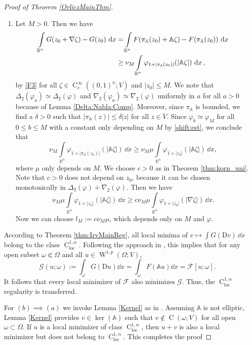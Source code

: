 \documentclass[a4paper,11pt]{amsart}
\numberwithin{equation}{section}
\newcommand{\R}{\mathbb{R}}
\newcommand{\sobo}{\operatorname{W}}
\newcommand{\hold}{\operatorname{C}}
\begin{document}
\begin{proof}[Proof of Theorem \ref{OrliczMainThm}]
\begin{enumerate}
			\item Let $M > 0$. Then we have
			\begin{align}
				\int \limits_{\R^n} G(z_0 + \nabla \zeta) - G(z_0) \, \dd{x} & = \int \limits_{\R^n} F(\pi_{\mathbb{A}} (z_0) + \mathbb{A} \zeta) - F(\pi_{\mathbb{A}} (z_0)) \, \dd{x} \label{eq:juhu}\\
				& \geq  \nu_M \int \limits_{\R^n} \varphi_{1+|\pi_{\mathbb{A}}(z_0)|}(|\mathbb{A} \zeta|) \, \dd{x},\notag
			\end{align}
			by \ref{F3} for all $\zeta \in \hold_c^\infty((0,1)^n; V)$ and $|z_0| \leq M$.
			We note that $\Delta_2(\varphi_a) \simeq \Delta_2(\varphi)$ and $\nabla_2(\varphi_a) \simeq\nabla_2(\varphi)$ uniformly in $a$ for all $a>0$ because of Lemma \ref{Delta:Nabla:Comp}. Moreover, since $\pi_{\mathbb{A}}$ is bounded, we find a $\delta > 0$ such that $|\pi_{\mathbb{A}}(z)| \leq \delta |z|$ for all $z \in V$. Since $\varphi_b \simeq \varphi_{M}$ for all $0 \leq b \leq M$ with a constant only depending on $M$ by \eqref{shift:est}, we conclude that
			\[
			\nu_M \int \limits_{\R^n} \varphi_{1+|\pi_{\mathbb{A}}(z_0)|}(|\mathbb{A} \zeta|) \, \dd{x} \geq \nu_M \mu \int \limits_{\R^n} \varphi_{1+|z_0|}(|\mathbb{A} \zeta|) \, \dd{x},
			\]
			where $\mu$ only depends on $M$. We choose $c > 0$ as in Theorem \ref{thm:korn_uni}. Note that $c > 0$ does not depend on $z_0$, because it can be chosen monotonically in $\Delta_2(\varphi) + \nabla_2(\varphi)$. Then we have
			\[
			\nu_M \mu \int \limits_{\R^n} \varphi_{1+|z_0|}(|\mathbb{A} \zeta|) \, \dd{x} \geq c \nu_M \mu \int \limits_{\R^n} \varphi_{1+|z_0|}(|\nabla \zeta|) \, \dd{x}.
			\]
			Now we can choose $l_M := c \nu_M \mu$, which depends only on $M$ and $\varphi$.
		\end{enumerate}
		According to Theorem \ref{thm:IrvMainReg}, all local minima of $v \mapsto \int G(\mathrm{D} v) \, \dd{x}$ belong to the class $\hold_\text{loc}^{1, \alpha}$. Following the approach in \cite{contiFXG}, this implies that for any open subset $\omega \Subset \Omega$ and all $u \in \sobo^{1,p}(\Omega;V)$,
		\begin{equation}
			\mathcal{G}(u; \omega) := \int_\omega G(\mathrm{D}u) \dd{x} = \int_\omega F(\mathbb{A}u) \dd{x} = \mathcal{F}[u;\omega]. \label{fct:G}
		\end{equation}
		It follows that every local minimizer of $\mathcal{F}$ also minimizes $\mathcal{G}$. Thus, the $\hold_{\text{loc}}^{1, \alpha}$ regularity is transferred.
		
		For  $(b)\!\implies\!(a)$ we invoke Lemma \ref{Kernel} as in \cite{contiFXG}. Assuming $\mathbb{A}$ is not elliptic, Lemma \ref{Kernel} provides $v \in \ker(\mathbb{A})$ such that $v \not \in \hold(\omega; V)$ for all open $\omega \subset \Omega$. If $u$ is a local minimizer of class $\hold^{1,\alpha}_{\text{loc}}$, then $u+v$ is also a local minimizer but does not belong to $\hold^{1,\alpha}_{\text{loc}}$. This completes the proof
	\end{proof}
\end{document}
